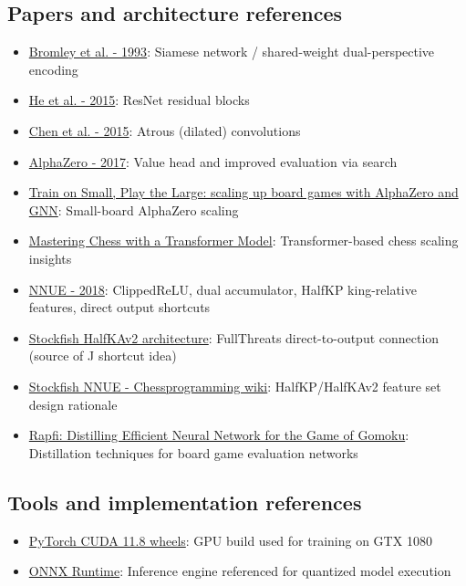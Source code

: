 \documentclass[11pt,a4paper]{article}
\begin{document}
\subsection{Papers and architecture references}
\begin{itemize}
  \item \href{https://papers.nips.cc/paper/1993/hash/0d4262ad58b4d3866d5aa0f4f9e1c06b-Abstract.html}{Bromley et al. - 1993}: Siamese network / shared-weight dual-perspective encoding
  \item \href{https://arxiv.org/abs/1512.03385}{He et al. - 2015}: ResNet residual blocks
  \item \href{https://arxiv.org/abs/1511.07122}{Chen et al. - 2015}: Atrous (dilated) convolutions
  \item \href{https://arxiv.org/abs/1712.01815}{AlphaZero - 2017}: Value head and improved evaluation via search
  \item \href{https://arxiv.org/pdf/2107.08387}{Train on Small, Play the Large: scaling up board games with AlphaZero and GNN}: Small-board AlphaZero scaling
  \item \href{https://arxiv.org/html/2409.12272v1#S6}{Mastering Chess with a Transformer Model}: Transformer-based chess scaling insights
  \item \href{https://official-stockfish.github.io/docs/nnue-pytorch-wiki/docs/nnue.html}{NNUE - 2018}: ClippedReLU, dual accumulator, HalfKP king-relative features, direct output shortcuts
  \item \href{https://github.com/official-stockfish/Stockfish/blob/master/src/nnue/nnue_architecture.h}{Stockfish HalfKAv2 architecture}: FullThreats direct-to-output connection (source of J shortcut idea)
  \item \href{https://www.chessprogramming.org/Stockfish_NNUE}{Stockfish NNUE - Chessprogramming wiki}: HalfKP/HalfKAv2 feature set design rationale
  \item \href{https://arxiv.org/html/2503.13178}{Rapfi: Distilling Efficient Neural Network for the Game of Gomoku}: Distillation techniques for board game evaluation networks
\end{itemize}

\subsection{Tools and implementation references}
\begin{itemize}
  \item \href{https://download.pytorch.org/whl/cu118}{PyTorch CUDA 11.8 wheels}: GPU build used for training on GTX 1080
  \item \href{https://onnxruntime.ai}{ONNX Runtime}: Inference engine referenced for quantized model execution
\end{itemize}
\end{document}
